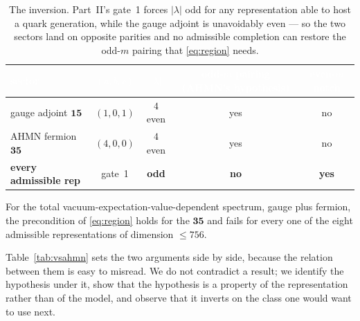 \documentclass[11pt,a4paper]{article}
\newcommand{\lam}{|\lambda|}
\begin{document}
\begin{table}[t]
\centering\small
\begin{tabular}{lccc c}
\toprule
\rowcolor{hdrblue}
\textcolor{white}{sector} & \textcolor{white}{$(a,b,c)$} & \textcolor{white}{$\lam$} &
\textcolor{white}{odd-$m$ pairing (AHMN's hypothesis)} & \textcolor{white}{even-$m$ notch}\\
\midrule
gauge adjoint $\mathbf{15}$ & $(1,0,1)$ & $4$ even & yes & no\\
\rowcolor{softgrey}
AHMN fermion $\mathbf{35}$ & $(4,0,0)$ & $4$ even & yes & no\\
\textbf{every admissible rep} & gate~1 & \textbf{odd} & \textbf{no} & \textbf{yes}\\
\bottomrule
\end{tabular}
\caption{The inversion. Part~II's gate~1 forces $\lam$ odd for any representation able to
host a quark generation, while the gauge adjoint is unavoidably even --- so the two sectors
land on opposite parities and no admissible completion can restore the odd-$m$ pairing that
\eqref{eq:region} needs.}
\label{tab:flip}
\end{table}

For the total vacuum-expectation-value-dependent spectrum, gauge plus fermion, the
precondition of \eqref{eq:region} holds for the $\mathbf{35}$ and fails for every one of the
eight admissible representations of dimension $\le756$.

Table~\ref{tab:vsahmn} sets the two arguments side by side, because the relation between them
is easy to misread. We do not contradict a result; we identify the hypothesis under it, show
that the hypothesis is a property of the representation rather than of the model, and observe
that it inverts on the class one would want to use next.
\end{document}
